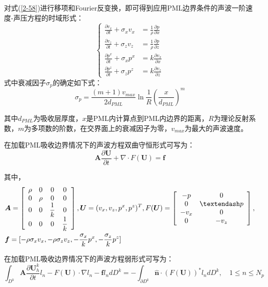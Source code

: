 \documentclass[12pt]{article}
\begin{document}
\par
对式(\ref{2-58})进行移项和Fourier反变换，即可得到应用PML边界条件的声波一阶速度-声压方程的时域形式：
\begin{equation}\label{2-59}
\left\{ 
\begin{aligned}
\frac{\partial v_x}{\partial t}+\sigma_x v_x & = \frac{1}{\rho}\frac{\partial p}{\partial x}\\
\frac{\partial v_z}{\partial t}+\sigma_z v_z & = \frac{1}{\rho}\frac{\partial p}{\partial z}\\
\frac{\partial p^x}{\partial t}+\sigma_x p^x & = k\frac{\partial v_x}{\partial x}\\
\frac{\partial p^z}{\partial t}+\sigma_z p^z & = k\frac{\partial v_z}{\partial z}
\end{aligned}
\right.
\end{equation}
式中衰减因子$\sigma_p$的确定如下式：
\begin{equation}\label{2-60}
\sigma_p=\frac{(m+1)v_{max}}{2d_{PML}}\ln{\frac{1}{R}}(\frac{x}{d_{PML}})^m
\end{equation}
\par
其中$d_{PML}$为吸收层厚度，$x$是PML内计算点到PML内边界的距离，$R$为理论反射系数，$m$为多项数的阶数，在交界面上的衰减因子为零，$v_{max}$为最大的声波速度。
\par
在加载PML吸收边界情况下的声波方程双曲守恒形式可写为：
\begin{equation}\label{2-61}
\boldsymbol{A}\frac{\partial \boldsymbol{U}}{\partial t}+\nabla \cdot F(\boldsymbol{U})=\boldsymbol{f}
\end{equation}
\par
其中，
\begin{equation*}
\begin{split}
&\boldsymbol{A}=\left [ 
\begin{array}{>{\displaystyle}c>{\displaystyle}c>{\displaystyle}c>{\displaystyle}c}
\rho & 0 & 0 & 0\\0 & \rho & 0 & 0\\0 & 0 & \frac{1}{k} & 0\\0 & 0 & 0 & \frac{1}{k} 
\end{array} 
\right ],
\boldsymbol{U}=(v_x,v_z,p^x,p^z)^T,F(\boldsymbol{U})=\left[ \begin{array}{>{\displaystyle}c>{\displaystyle}c}
-p & 0\\0 & –p\\-v_x & 0\\0 & -v_z 
\end{array} 
\right],\\
&\boldsymbol{f}=[-\rho \sigma_x v_x,-\rho \sigma_z v_z,-\frac{\sigma_x}{k}p^x,-\frac{\sigma_z}{k}p^z]
\end{split}
\end{equation*}
\par
在加载PML吸收边界情况下的声波方程弱形式可写为：
\begin{equation}\label{2-62}
\int_{D^k}\boldsymbol{A}\frac{\partial \boldsymbol{U}_h^k}{\partial t}l_n-F(\boldsymbol{U})\cdot \nabla l_n-\boldsymbol{f}l_n dD^k=-\int_{\partial D^k}\hat{\boldsymbol{n}}\cdot (F(\boldsymbol{U}))^*l_n dD^k,\quad 1 \le n \le N_p
\end{equation}
\end{document}

